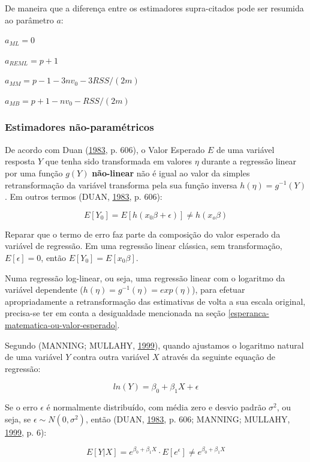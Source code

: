 \documentclass[a4paper]{article}
\begin{document}
De maneira que a diferença entre os estimadores supra-citados pode ser
resumida ao parâmetro \(a\):

\(a_{ML} = 0\)

\(a_{REML} = p+1\)

\(a_{MM} = p - 1 - 3nv_0 - 3RSS/(2m)\)

\(a_{MB} = p + 1 - nv_0 - RSS/(2m)\)

\subsubsection{Estimadores
não-paramétricos}\label{estimadores-nao-parametricos}

De acordo com Duan (\protect\hyperlink{ref-Duan}{1983}, p. 606), o Valor
Esperado \(E\) de uma variável resposta \(Y\) que tenha sido
transformada em valores \(\eta\) durante a regressão linear por uma
função \(g(Y)\) \textbf{não-linear} não é igual ao valor da simples
retransformação da variável transforma pela sua função inversa
\(h(\eta) = g^{-1}(Y)\). Em outros termos (DUAN,
\protect\hyperlink{ref-Duan}{1983}, p. 606):

\[E[Y_0] = E[h(x_0\beta + \epsilon)] \ne h(x_o\beta)\]

Reparar que o termo de erro faz parte da composição do valor esperado da
variável de regressão. Em uma regressão linear clássica, sem
transformação, \(E[\epsilon] = 0\), então \(E[Y_0] = E[x_0\beta]\).

Numa regressão log-linear, ou seja, uma regressão linear com o logaritmo
da variável dependente (\(h(\eta) = g^{-1}(\eta) = exp(\eta)\)), para
efetuar apropriadamente a retransformação das estimativas de volta a sua
escala original, precisa-se ter em conta a desigualdade mencionada na
seção \ref{esperanca-matematica-ou-valor-esperado}.

Segundo (MANNING; MULLAHY, \protect\hyperlink{ref-NBERt0246}{1999}),
quando ajustamos o logaritmo natural de uma variável \(Y\) contra outra
variável \(X\) através da seguinte equação de regressão:

\[ln(Y) = \beta_0 + \beta_1X + \epsilon\]

Se o erro \(\epsilon\) é normalmente distribuído, com média zero e
desvio padrão \(\sigma^2\), ou seja, se
\(\epsilon \sim N(0, \sigma^2)\), então (DUAN,
\protect\hyperlink{ref-Duan}{1983}, p. 606; MANNING; MULLAHY,
\protect\hyperlink{ref-NBERt0246}{1999}, p. 6):

\[E[Y|X] = e^{\beta_0 + \beta_1X} \cdot E[e^\epsilon] \ne e^{\beta_0 + \beta_1X}\]
\end{document}
